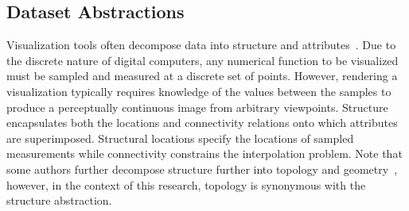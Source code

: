\subsection{Dataset Abstractions}
Visualization tools often decompose data into structure and
attributes~\cite{vtk}. Due to the discrete nature of digital
computers, any numerical function to be visualized must be sampled and
measured at a discrete set of points. However, rendering a
visualization typically requires knowledge of the values between the
samples to produce a perceptually continuous image from arbitrary
viewpoints. Structure encapsulates both the locations and connectivity
relations onto which attributes are superimposed. Structural locations
specify the locations of sampled measurements while connectivity
constrains the interpolation problem. Note that some authors further
decompose structure further into topology and geometry~\cite{weiler},
however, in the context of this research, topology is synonymous with
the structure abstraction.

